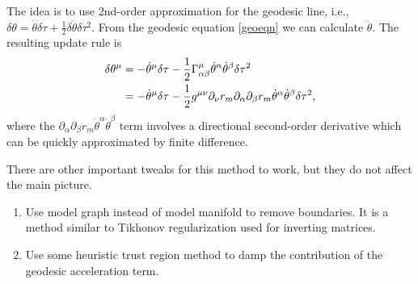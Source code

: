 \documentclass{amsart}
\theoremstyle{definition}
\theoremstyle{remark}
\numberwithin{equation}{section}
\begin{document}
The idea is to use 2nd-order approximation for the geodesic line, i.e., $\delta\theta = \dot \theta \delta\tau + \frac{1}{2}\delta \ddot \theta \delta\tau^2$. From the geodesic equation \eqref{geoeqn} we can calculate $\ddot \theta$. The resulting update rule is
\begin{align}
	\delta \theta^\mu &= - \dot \theta^\mu \delta \tau - \frac{1}{2}\Gamma_{\alpha\beta}^\mu \dot \theta^\alpha \dot \theta^\beta \delta\tau^2\notag\\
	&= -\dot \theta^\mu \delta \tau - \frac{1}{2} g^{\mu\nu}\partial_\nu r_m \partial_\alpha \partial_\beta r_m \dot \theta^\alpha \dot \theta^\beta \delta\tau^2,
\end{align}
where the $\partial_\alpha \partial_\beta r_m \dot \theta^\alpha \dot \theta^\beta$ term involves a directional second-order derivative which can be quickly approximated by finite difference.

There are other important tweaks for this method to work, but they do not affect the main picture. 
\begin{enumerate}
	\item Use model graph instead of model manifold to remove boundaries. It is a method similar to Tikhonov regularization used for inverting matrices.
	\item Use some heuristic trust region method to damp the contribution of the geodesic acceleration term.
\end{enumerate}
\end{document}
